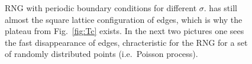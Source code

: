         \begin{figure}[htbp]
            \centering

            \caption[Examples of RNG for different $\sigma$]
            {
                RNG with periodic boundary conditions for different \(\sigma\).
                 has still almost the square lattice
                configuration of edges, which is why the plateau from Fig.\ \ref{fig:Tc}
                exists. In the next two pictures one sees the fast disappearance
                of edges, chracteristic for the RNG for a set of randomly
                distributed points (i.e.\ Poisson process).
            }
            \label{fig:RNG_sigma}
        \end{figure}

